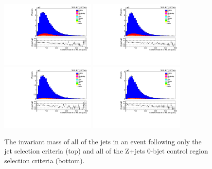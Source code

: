 \begin{figure}[ht]
\centering
\includegraphics[width=0.42\textwidth]{figs/background-estimation/plots/unblinded/DY_control_old_prompt_ee_DYamcatnlo/totalJetMass_SingleTop_jetSel_ee.pdf}
\includegraphics[width=0.42\textwidth]{figs/background-estimation/plots/unblinded/DY_control_old_prompt_mumu_DYamcatnlo/totalJetMass_SingleTop_jetSel_mumu.pdf}
\\
\includegraphics[width=0.42\textwidth]{figs/background-estimation/plots/unblinded/DY_control_old_prompt_ee_DYamcatnlo/totalJetMass_SingleTop_wMass_ee.pdf}
\includegraphics[width=0.42\textwidth]{figs/background-estimation/plots/unblinded/DY_control_old_prompt_mumu_DYamcatnlo/totalJetMass_SingleTop_wMass_mumu.pdf}
\caption{
The invariant mass of all of the jets in an event following only the jet selection criteria (top) and all of the Z+jets 0-bjet control region selection criteria (bottom).
}
\label{fig:CR_NLO_totalJetMass}
\end{figure}

